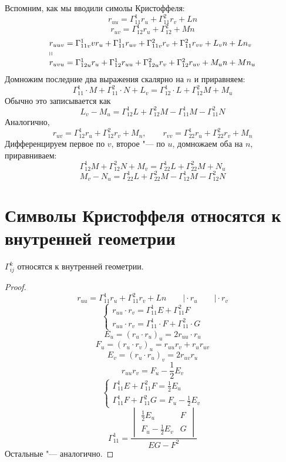 Вспомним, как мы вводили симолы Кристоффеля:
$$ r_{uu} = \Gamma_{11}^1 r_u + \Gamma_{11}^2 r_v + Ln $$
$$ r_{uv} = \Gamma_{12}^1r_u + \Gamma_{12}^2 + Mn $$
$$
\begin{array}l
	r_{uuv} = \Gamma_{11v}^1vr_u + \Gamma_{11}^1r_{uv} + \Gamma_{11v}^2r_v + \Gamma_{11}^2r_{vv} + L_vn + Ln_v \\
	\shortparallel \\
	r_{uvu} = \Gamma_{12u}^1r_u + \Gamma_{12}^1r_{uu} + \Gamma_{12u}^2r_v + \Gamma_{12}^2r_{uv} + M_un + Mn_u
\end{array} $$
Домножим последние два выражения скалярно на $ n $ и приравняем:
$$ \Gamma_{11}^1 \cdot M + \Gamma_{11}^2 \cdot N + L_v = \Gamma_{12}^1 \cdot L + \Gamma_{12}^2M + M_u $$
Обычно это записывается как
$$ \boxed{L_v - M_u = \Gamma_{12}^1L + \Gamma_{12}^2M - \Gamma_{11}^1M - \Gamma_{11}^2N} $$
Аналогично,
$$ r_{uv} = \Gamma_{12}^1r_u + \Gamma_{12}^2r_v + M_n, \qquad r_{vv} = \Gamma_{22}^1r_u + \Gamma_{22}^2r_v + M_n $$
Дифференцируем первое по $ v $, второе "--- по $ u $, домножаем оба на $ n $, приравниваем:
$$ \Gamma_{12}^1M + \Gamma_{12}^2N + M_v = \Gamma_{22}^1L + \Gamma_{22}^2M + N_u $$
$$ \boxed{M_v - N_u = \Gamma_{22}^1L + \Gamma_{22}^2M - \Gamma_{12}^1M - \Gamma_{12}^2N} $$

\section{Символы Кристоффеля относятся к внутренней геометрии}

\begin{theorem}
	$ \Gamma_{ij}^k $ относятся к внутренней геометрии.
\end{theorem}

\begin{proof}
	$$ r_{uu} = \Gamma_{11}^1r_u + \Gamma_{11}^2 r_v + Ln \qquad \bigg| \cdot r_u \qquad \bigg| \cdot r_v $$
	$$
	\begin{cases}
		r_{uu} \cdot r_v = \Gamma_{11}^1E + \Gamma_{11}^2F \\
		r_{uu} \cdot r_v = \Gamma_{11}^1 \cdot F + \Gamma_{11}^2 \cdot G
	\end{cases} $$
	$$ E_u = (r_u \cdot r_u)_u = 2r_{uu} \cdot r_u $$
	$$ F_u = (r_u \cdot r_v)_u = r_{uu} r_v + r_ur_{uv} $$
	$$ E_v = (r_u \cdot r_u)_v = 2r_{uv}r_u $$
	$$ r_{uu}r_v = F_u - \frac12 E_v $$
	$$
	\begin{cases}
		\Gamma_{11}^1E + \Gamma_{11}^2F = \frac12 E_u \\
		\Gamma_{11}^1F + \Gamma_{11}^2G = F_u - \frac12 E_v
	\end{cases} $$
	$$ \boxed{\Gamma_{11}^1 = \frac{
			\begin{vmatrix}
				\frac12E_u & F \\
				F_u - \frac12 E_v & G
			\end{vmatrix}}{EG - F^2}} $$
	Остальные "--- аналогично.
\end{proof}


